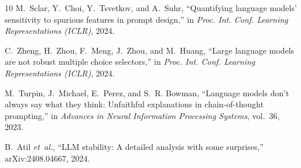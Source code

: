 \documentclass[journal]{IEEEtran}
\begin{document}
\begin{thebibliography}{10}
M.~Sclar, Y.~Choi, Y.~Tsvetkov, and A.~Suhr, ``Quantifying language models' sensitivity to spurious features in prompt design,'' in \emph{Proc. Int. Conf. Learning Representations (ICLR)}, 2024.

C.~Zheng, H.~Zhou, F.~Meng, J.~Zhou, and M.~Huang, ``Large language models are not robust multiple choice selectors,'' in \emph{Proc. Int. Conf. Learning Representations (ICLR)}, 2024.

M.~Turpin, J.~Michael, E.~Perez, and S.~R. Bowman, ``Language models don't always say what they think: Unfaithful explanations in chain-of-thought prompting,'' in \emph{Advances in Neural Information Processing Systems}, vol.~36, 2023.

B.~Atil \emph{et~al.}, ``LLM stability: A detailed analysis with some surprises,'' arXiv:2408.04667, 2024.
\end{thebibliography}
\end{document}
